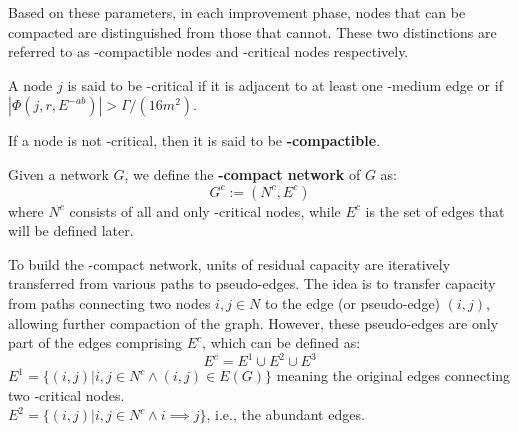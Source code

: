 Based on these parameters, in each improvement phase, nodes that can be compacted are distinguished from those that cannot. These two distinctions are referred to as \gmm-compactible nodes and \gmm-critical nodes respectively.
    \begin{definition}
        
        A node $j$ is said to be \gmm-critical if it is adjacent to at least one \gmm-medium edge or if  $|\Phi (j, r, E^{-ab})| > \Gamma/(16m^2)$.

        If a node is not \gmm-critical, then it is said to be \textbf{\gmm-compactible}.

        
        Given a network $G$, we define the \textbf{\gmm-compact network} of $G$ as: \[G^c := (N^c, E^c)\]
        where $N^c$ consists of all and only \gmm-critical nodes, while $E^c$ is the set of edges that will be defined later.
    \end{definition}
    To build the \gmm-compact network, units of residual capacity are iteratively transferred from various paths to pseudo-edges. The idea is to transfer capacity from paths connecting two nodes $i,j\in N$ to the edge (or pseudo-edge) $(i,j)$, allowing further compaction of the graph.
    However, these pseudo-edges are only part of the edges comprising $E^c$, which can be defined as:
    \[E^c = E^1\cup E^2 \cup E^3\]
    $E^1 = \{(i,j) | i,j\in N^c \land (i,j) \in E(G)\}$ meaning the original edges connecting two \gmm-critical nodes.\\
    $E^2 = \{(i,j) | i,j\in N^c \land i\implies j\}$, i.e., the abundant edges.

